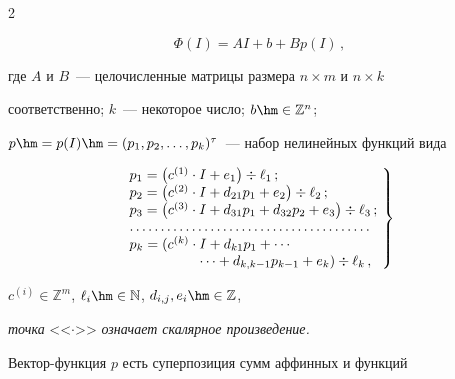 \begin{multicols}{2}
{\begin{equation}

\Phi(I)=AI+b+Bp(I)\,, \label{defKwaziAff}

\end{equation}

где $A$ и $B$~--- целочисленные матрицы размера $n\times m$ и $n\times k$

соответственно; $k$~--- некоторое число; $b\hm\in\mathbb{Z}^n$; 

$p\hm=p(I)\hm=(p_1,p_2,\ldots,p_k)^\tau$~--- набор нелинейных функций вида}



\noindent

\begin{equation}

\left.

\!\!\!\!\begin{array}{l}

 p_1 = \left(c^{(1)}\cdot I + e_1\right) \div \ell_1\,;\\

 p_2 = \left(c^{(2)}\cdot I + d_{21}p_1 + e_2\right) \div \ell_2\,;\\

 p_3 = \left(c^{(3)}\cdot I + d_{31}p_1 + d_{32}p_2 + e_3\right) \div \ell_3\,;\\

 \ldots \ldots \ldots \ldots \ldots \ldots \ldots \ldots \ldots \ldots\ldots\ldots\ldots\\

 p_k = (c^{(k)}\cdot I + d_{k1}p_1 + \cdots\\

 \hspace*{50pt}\cdots + d_{k,k-1}p_{k-1} + e_k) \div \ell_k\,,

\end{array}\!

\right\}\!\!

\label{defp}

\end{equation}

$c^{(i)}\in\mathbb{Z}^m$, $\ell_i\hm\in\mathbb{N}$, $d_{i,j},e_i\hm\in\mathbb{Z}$, 

\textit{точка} <<$\cdot$>> \textit{означает скалярное произведение.}



\smallskip



Вектор-функ\-ция $p$ есть суперпозиция сумм аффинных и функций


\end{multicols}
